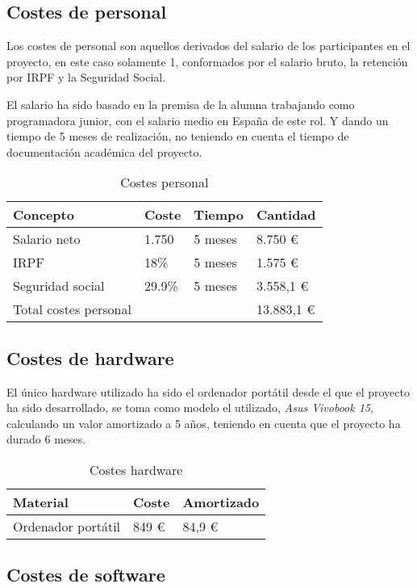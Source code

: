 \documentclass[a4paper,12pt,twoside]{memoir}
\begin{document}
\subsection{Costes de personal}
Los costes de personal son aquellos derivados del salario de los participantes en el proyecto, en este caso solamente 1, conformados por el salario bruto, la retención por IRPF y la Seguridad Social.

El salario ha sido basado en la premisa de la alumna trabajando como programadora junior, con el salario medio en España de este rol. Y dando un tiempo de 5 meses de realización, no teniendo en cuenta el tiempo de documentación académica del proyecto. \cite{salariopj}

\begin{table}[h!]
\centering
\begin{tabular}{llll}
\toprule
Concepto & Coste & Tiempo & Cantidad \\
\midrule
Salario neto & 1.750 & 5 meses & 8.750 €\\
IRPF & 18\% & 5 meses & 1.575 €\\
Seguridad social & 29.9\% & 5 meses & 3.558,1 €\\
Total costes personal & & & 13.883,1 €\\
\end{tabular}
\caption{Costes personal}
\label{tabla-costes personal}
\end{table}


\subsection{Costes de hardware}
El único hardware utilizado ha sido el ordenador portátil desde el que el proyecto ha sido desarrollado, se toma como modelo el utilizado, \textit{Asus Vivobook 15}, calculando un valor amortizado a 5 años, teniendo en cuenta que el proyecto ha durado 6 meses.

\begin{table}[h!]
\centering
\begin{tabular}{lll}
\toprule
Material & Coste & Amortizado\\
\midrule
Ordenador portátil & 849 € & 84,9 €\\
\end{tabular}
\caption{Costes hardware}
\label{tabla-hardware}
\end{table}

\subsection{Costes de software}
\end{document}
